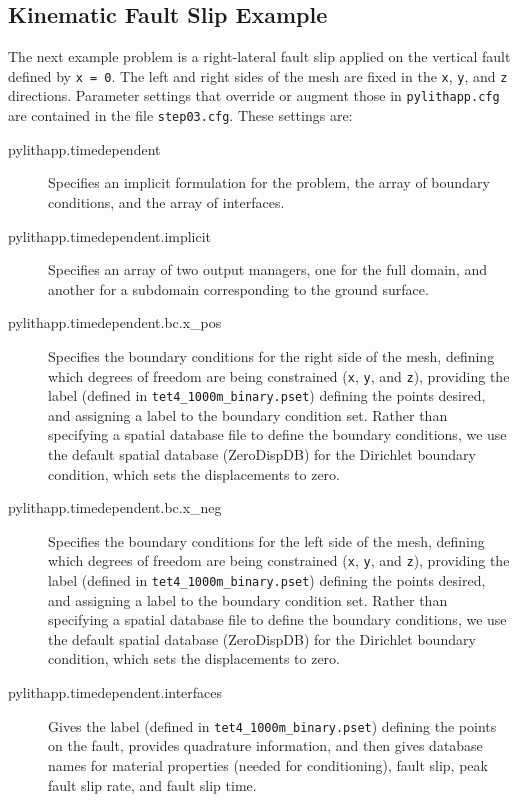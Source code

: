 \subsection{Kinematic Fault Slip Example}

The next example problem is a right-lateral fault slip applied on
the vertical fault defined by \texttt{x = 0}. The left and right sides
of the mesh are fixed in the \texttt{x}, \texttt{y}, and \texttt{z}
directions. Parameter settings that override or augment those in \texttt{pylithapp.cfg}
are contained in the file \texttt{step03.cfg}. These settings are:
\begin{description}
\item [{pylithapp.timedependent}] Specifies an implicit formulation for
the problem, the array of boundary conditions, and the array of interfaces.
\item [{pylithapp.timedependent.implicit}] Specifies an array of two output
managers, one for the full domain, and another for a subdomain corresponding
to the ground surface.
\item [{pylithapp.timedependent.bc.x\_pos}] Specifies the boundary conditions
for the right side of the mesh, defining which degrees of freedom
are being constrained (\texttt{x}, \texttt{y}, and \texttt{z}), providing
the label (defined in \texttt{tet4\_1000m\_binary.pset}) defining
the points desired, and assigning a label to the boundary condition
set. Rather than specifying a spatial database file to define the
boundary conditions, we use the default spatial database (ZeroDispDB)
for the Dirichlet boundary condition, which sets the displacements
to zero.
\item [{pylithapp.timedependent.bc.x\_neg}] Specifies the boundary conditions
for the left side of the mesh, defining which degrees of freedom are
being constrained (\texttt{x}, \texttt{y}, and \texttt{z}), providing
the label (defined in \texttt{tet4\_1000m\_binary.pset}) defining
the points desired, and assigning a label to the boundary condition
set. Rather than specifying a spatial database file to define the
boundary conditions, we use the default spatial database (ZeroDispDB)
for the Dirichlet boundary condition, which sets the displacements
to zero.
\item [{pylithapp.timedependent.interfaces}] Gives the label (defined in
\texttt{tet4\_1000m\_binary.pset}) defining the points on the fault,
provides quadrature information, and then gives database names for
material properties (needed for conditioning), fault slip, peak fault
slip rate, and fault slip time.

\end{description}
